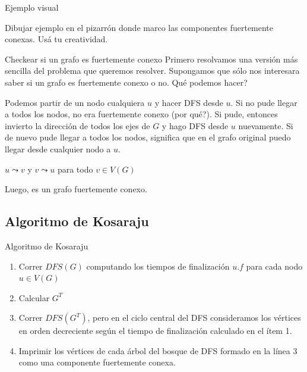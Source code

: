 \documentclass[compress]{beamer}
\newcommand{\bigpause}{\bigskip \pause}
\begin{document}
\begin{frame}{Ejemplo visual}

Dibujar ejemplo en el pizarrón donde marco las componentes fuertemente 
conexas. Usá tu creatividad.

\end{frame}

\begin{frame}{Checkear si un grafo es fuertemente conexo}
Primero resolvamos una versión más sencilla del problema que queremos
resolver. Supongamos que sólo nos interesara saber si un grafo es fuertemente
conexo o no. \textquestiondown Qué podemos hacer?

\bigpause

Podemos partir de un nodo cualquiera $u$ y hacer DFS desde $u$. Si no
pude llegar a todos los nodos, no era fuertemente conexo (\textquestiondown por qué?).
Si pude, entonces invierto la dirección de todos los ejes de $G$ y hago
DFS desde $u$ nuevamente. Si de nuevo pude llegar a todos los nodos,
significa que en el grafo original puedo llegar desde cualquier nodo a $u$.

\begin{center}
$u \leadsto v$ y $v \leadsto u$ para todo $v \in V(G)$
\end{center}

Luego, es un grafo fuertemente conexo.

\end{frame}


\subsection{Algoritmo de Kosaraju}
\begin{frame}{Algoritmo de Kosaraju}

\begin{enumerate}
\item Correr $DFS(G)$ computando los tiempos de finalización $u.f$ para cada nodo $u \in V(G)$
\item Calcular $G^T$
\item Correr $DFS(G^T)$, pero en el ciclo central del DFS consideramos
los vértices en orden decreciente según el tiempo de finalización calculado
en el ítem 1.
\item Imprimir los vértices de cada árbol del bosque de DFS formado en la línea
3 como una componente fuertemente conexa.
\end{enumerate}
\end{frame}
\end{document}
